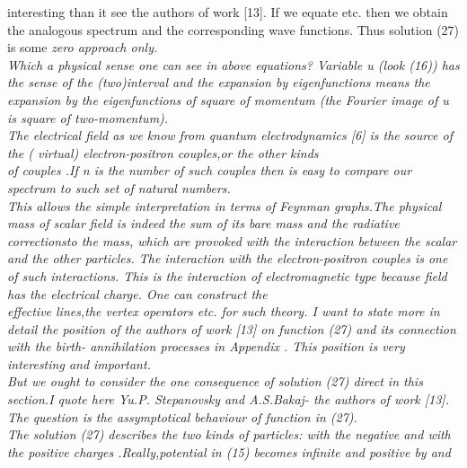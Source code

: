 \documentclass[a4paper,12pt] {article}
\begin{document}
{interesting  than it see the authors of work  [13]. If we equate
\coordHE{} etc. then we obtain the analogous spectrum
 \coordHE{} and the corresponding wave functions. Thus solution (27) is
 some \it  zero approach only.\\ \rm Which a  physical sense one can see in above equations? Variable
u (look (16)) has the sense of the \it (two)interval \rm  and the expansion by eigenfunctions \coordHE{}
means the expansion
 by the   \it  eigenfunctions of square of momentum \rm  (the Fourier image of u  is  square of
 two-momentum).\\ The electrical field \coordHE{} \rm  as we know from quantum electrodynamics [6]  is
 the \it source of the ( virtual) electron-positron couples,or the other kinds \\
 of couples .\rm If n is the
 number of such couples then \it is easy to compare  our spectrum  to  such set of
 natural numbers.\\ \rm This allows the simple interpretation in terms of Feynman graphs.The physical
 mass of scalar field \myHighlight{$\Psi $}\coordHE{} is indeed the  sum of \it its  bare  mass \rm and the \it radiative corrections\rm to the mass,
 which are provoked \it with the  interaction  between the scalar and  the other particles. \rm The
interaction  with the  electron-positron couples is one of such interactions. This is the interaction of
\it electromagnetic type \rm  because field \myHighlight{$\Psi $}\coordHE{} has the electrical charge. One can construct the\\
effective lines,the vertex operators etc. for such theory. I want to state more in detail the position of the authors
 of work  [13] on function (27) and its connection with  the  birth- annihilation processes in Appendix  . This  position  is very interesting and
important.
\\ But  we ought to consider the one consequence of solution (27)  direct in this section.I quote here
 Yu.P. Stepanovsky and A.S.Bakaj- the authors of work [13]. The question is the
 \it assymptotical behaviour \rm  of  function  \coordHE{} in (27).\\
 The solution (27)  describes the two kinds of particles: with the negative and with the  positive
 charges .Really,potential \coordHE{} in (15) becomes infinite and positive by  \coordHE{} and
}
\end{document}
